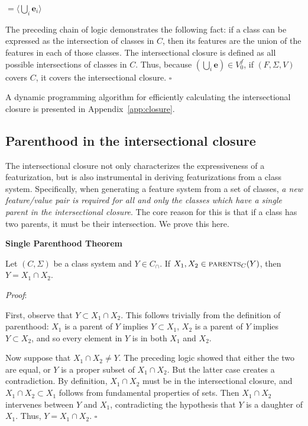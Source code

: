 \documentclass[12pt, oneside]{article}   	%
\newenvironment{clump}
{
	\edef\myindent{\the\parindent}
	\noindent\begin{minipage}{\textwidth}
	\setlength\parindent{\myindent}\fussy
}
{
	\end{minipage}
}
\begin{document}
\quad $= \langle \bigcup_i  \mathbf{e}_i \rangle$

\noindent The preceding chain of logic demonstrates the following fact: if a class can be expressed as the intersection of classes in $C$, then its features are the union of the features in each of those classes. The intersectional closure is defined as all possible intersections of classes in $C$. Thus, because $(\bigcup_i \mathbf{e}) \in V_0^f$, if $(F, \Sigma, V)$ covers $C$, it covers the intersectional closure. $\square$

\vspace{\baselineskip} A dynamic programming algorithm for efficiently calculating the intersectional closure is presented in Appendix~\ref{app:closure}.

\subsection{Parenthood in the intersectional closure}
\label{sec:intersection_proof}

The intersectional closure not only characterizes the expressiveness of a featurization, but is also instrumental in deriving featurizations from a class system. Specifically, when generating a feature system from a set of classes, \textit{a new feature/value pair is required for all and only the classes which have a single parent in the intersectional closure}. The core reason for this is that if a class has two parents, it must be their intersection. We prove this here.

\begin{clump}
\vspace{\baselineskip} \noindent \textbf{Single Parenthood Theorem}

\noindent Let $(C, \Sigma)$ be a class system and $Y \in C_\cap$. If $X_1, X_2 \in \textsc{parents}_C(Y)$, then $Y = X_1 \cap X_2$.
\end{clump}

\noindent \textit{Proof}:

First, observe that $Y \subset X_1 \cap X_2$. This follows trivially from the definition of parenthood: $X_1$ is a parent of $Y$ implies $Y \subset X_1$, $X_2$ is a parent of $Y$ implies $Y \subset X_2$, and so every element in $Y$ is in both $X_1$ and $X_2$.

Now suppose that $X_1 \cap X_2 \neq Y$. The preceding logic showed that either the two are equal, or $Y$ is a proper subset of $X_1 \cap X_2$. But the latter case creates a contradiction. By definition, $X_1 \cap X_2$ must be in the intersectional closure, and $X_1 \cap X_2 \subset X_1$ follows from fundamental properties of sets. Then $X_1 \cap X_2$ intervenes between $Y$ and $X_1$, contradicting the hypothesis that $Y$ is a daughter of $X_1$. Thus, $Y = X_1 \cap X_2$. $\square$
	
\end{document}
